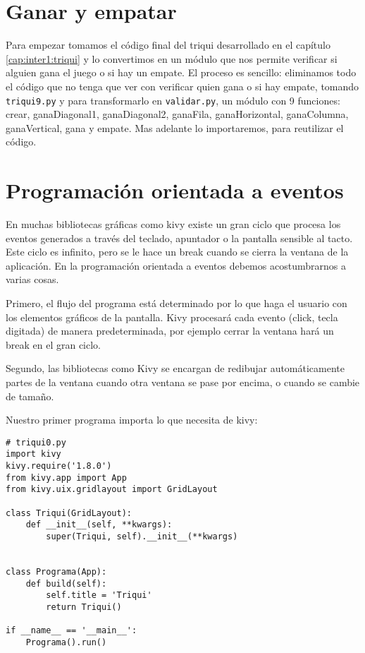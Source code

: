 \section{Ganar y empatar}
Para empezar tomamos el código final del triqui desarrollado en el capítulo \ref{cap:inter1:triqui}
y lo convertimos en un módulo que nos permite verificar si alguien gana el juego o
si hay un empate. El proceso es sencillo: eliminamos todo el código que no tenga que ver con 
verificar quien gana o si hay empate, tomando \texttt{triqui9.py} y para transformarlo en 
\texttt{validar.py}, un módulo con 9 funciones: crear,  ganaDiagonal1,  ganaDiagonal2, ganaFila, ganaHorizontal, ganaColumna,
ganaVertical, gana y empate. Mas adelante lo importaremos, para reutilizar el código.



\section{Programación orientada a eventos}

En muchas bibliotecas gráficas como kivy existe un gran ciclo que procesa
los eventos generados a través del teclado, apuntador o la pantalla
sensible al tacto. Este ciclo es infinito, pero se le hace un break
cuando se cierra la ventana de la aplicación. En la programación orientada
a eventos debemos acostumbrarnos a varias cosas.

Primero, el flujo del programa está determinado por lo que haga el usuario con
los elementos gráficos de la pantalla. Kivy procesará cada evento (click,
tecla digitada) de manera predeterminada, por ejemplo cerrar la
ventana hará un break en el gran ciclo.


Segundo, las bibliotecas como Kivy se encargan de redibujar automáticamente 
partes de la ventana cuando otra ventana se pase por encima, o cuando se cambie de tamaño.

Nuestro primer programa importa lo que necesita de kivy:

\beforeverb
\begin{verbatim}
# triqui0.py
import kivy
kivy.require('1.8.0')
from kivy.app import App
from kivy.uix.gridlayout import GridLayout

class Triqui(GridLayout):
    def __init__(self, **kwargs):
        super(Triqui, self).__init__(**kwargs)
   

class Programa(App):
    def build(self):
        self.title = 'Triqui'
        return Triqui()

if __name__ == '__main__':
    Programa().run()
\end{verbatim}
\afterverb

